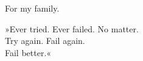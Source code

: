 
\newpage\null

\vfill
For my family.
\vfill

\begin{savequote}[75mm] %
»Ever tried. Ever failed. No matter.\\
\quad Try again. Fail again.\\
\quad Fail better.«
\end{savequote}
